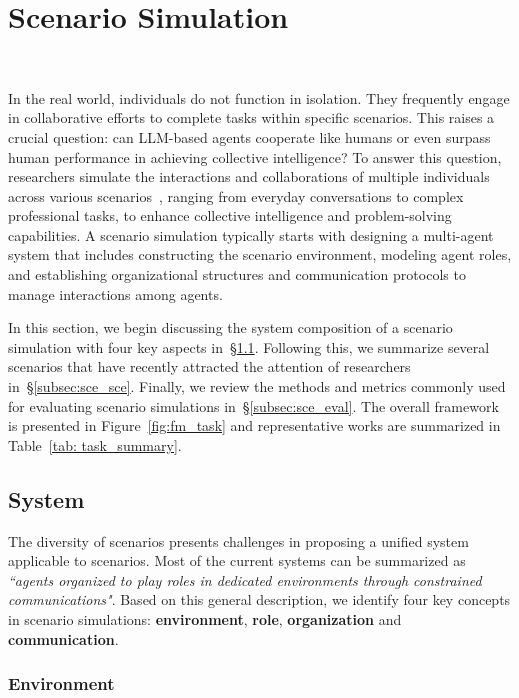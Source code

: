 \section{Scenario Simulation}~\label{sec:task}



In the real world, individuals do not function in isolation. They frequently engage in collaborative efforts to complete tasks within specific scenarios. This raises a crucial question: can LLM-based agents cooperate like humans or even surpass human performance in achieving collective intelligence? To answer this question, researchers simulate the interactions and collaborations of multiple individuals across various scenarios~\cite{qian2023communicative,hong2023metagpt,wu2023autogen}, ranging from everyday conversations to complex professional tasks, to enhance collective intelligence and problem-solving capabilities. A scenario simulation typically starts with designing a multi-agent system that includes constructing the scenario environment, modeling agent roles, and establishing organizational structures and communication protocols to manage interactions among agents.

In this section, we begin discussing the system composition of a scenario simulation with four key aspects in~\S\ref{subsec:sce_sys}. Following this, we summarize several scenarios that have recently attracted the attention of researchers in~\S\ref{subsec:sce_sce}. Finally, we review the methods and metrics commonly used for evaluating scenario simulations in~\S\ref{subsec:sce_eval}. The overall framework is presented in Figure~\ref{fig:fm_task} and representative works are summarized in Table~\ref{tab: task_summary}.

\subsection{System}\label{subsec:sce_sys}

The diversity of scenarios presents challenges in proposing a unified system applicable to scenarios. 
Most of the current systems can be summarized as \textit{``agents organized to play roles in dedicated environments through constrained communications"}.
Based on this general description, we identify four key concepts in scenario simulations: \textbf{environment}, \textbf{role}, \textbf{organization} and \textbf{communication}.


\subsubsection{Environment}


